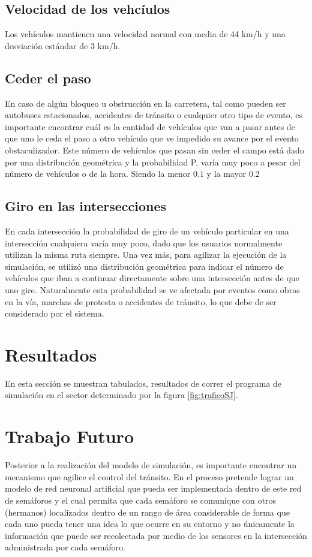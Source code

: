 \documentclass[12pt,journal,compsoc]{IEEEtran}
\begin{document}
\subsection{Velocidad de los vehcíulos}
Los veh\'iculos mantienen una velocidad normal con media de 44 km/h y una desviaci\'on est\'andar de 3 km/h. 

\subsection{Ceder el paso}
En caso de alg\'un bloqueo u obstrucci\'on en la carretera, tal como pueden ser autobuses estacionados, accidentes de tr\'ansito o cualquier otro tipo de evento, es importante encontrar cuál es la cantidad de veh\'iculos que van a pasar antes de que uno le ceda el paso a otro veh\'iculo que ve impedido su avance por el evento obstaculizador. Este número de vehículos que pasan sin ceder el campo está dado por una distribuci\'on geom\'etrica y la probabilidad P, var\'ia muy poco a pesar del n\'umero de veh\'iculos o de la hora. Siendo la menor $0.1$ y la mayor $0.2$ 

\subsection{Giro en las intersecciones}
En cada intersecci\'on la probabilidad de giro de un veh\'iculo particular en una intersecci\'on cualquiera var\'ia muy poco, dado que los usuarios normalmente utilizan la misma ruta siempre. Una vez m\'as, para agilizar la ejecuci\'on de la simulaci\'on, se utiliz\'o una distribuci\'on geom\'etrica para indicar el n\'umero de veh\'iculos que iban a continuar directamente sobre una intersecci\'on antes de que uno gire. Naturalmente esta probabilidad se ve afectada por eventos como obras en la v\'ia, marchas de protesta o accidentes de tr\'ansito, lo que debe de ser considerado por el sistema.


\section{Resultados}
En esta secci\'on se muestran tabulados, resultados de correr el programa de simulación en el sector determinado por la figura \ref{fig:traficoSJ}.

\section{Trabajo Futuro}
Posterior a la realizaci\'{o}n del modelo de simulaci\'{o}n, es importante encontrar un mecanismo que agilice el control del tr\'ansito. En el proceso pretende lograr un modelo de red neuronal artificial que pueda ser implementada dentro de este red de sem\'{a}foros y el cual permita que cada sem\'{a}foro se comunique con otros (hermanos) localizados dentro de un rango de \'{a}rea considerable de forma que cada uno pueda tener una idea lo que ocurre en su entorno y no \'{u}nicamente la informaci\'{o}n que puede ser recolectada por medio de los sensores en la intersecci\'{o}n administrada por cada sem\'{a}foro.
\end{document}
